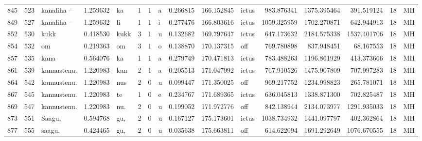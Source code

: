 \begin{tabular}{lrlrllllrrlrrrll}
845  &         523 &       kanaliha – &  1.259632 &      ka &        1 &      1 &       a &      0.266815 &    166.152845 &  ictus &   983.876341 &  1375.395464 &   391.519124 &     18 &        MH \\
849  &         527 &       kanaliha – &  1.259632 &      li &        1 &      1 &       i &      0.277476 &    166.803616 &  ictus &  1059.325959 &  1702.270871 &   642.944913 &     18 &        MH \\
852  &         530 &             kukk &  0.418530 &    kukk &        3 &      1 &       u &      0.132682 &    169.797647 &  ictus &   647.173632 &  2184.575338 &  1537.401706 &     18 &        MH \\
854  &         532 &               om &  0.219363 &      om &        3 &      1 &       o &      0.138870 &    170.137315 &    off &   769.780898 &   837.948451 &    68.167553 &     18 &        MH \\
857  &         535 &             kana &  0.564076 &      ka &        1 &      1 &       a &      0.279749 &    170.471813 &  ictus &   783.488263 &  1196.861929 &   413.373666 &     18 &        MH \\
861  &         539 &      kannustenu. &  1.220983 &     kan &        2 &      1 &       a &      0.205513 &    171.047992 &  ictus &   767.910526 &  1475.907809 &   707.997283 &     18 &        MH \\
864  &         542 &      kannustenu. &  1.220983 &     nus &        2 &      0 &       u &      0.099447 &    171.350025 &    off &   969.217752 &  1234.998823 &   265.781071 &     18 &        MH \\
867  &         545 &      kannustenu. &  1.220983 &      te &        1 &      0 &       e &      0.234767 &    171.689365 &  ictus &   636.045813 &  1338.871300 &   702.825487 &     18 &        MH \\
869  &         547 &      kannustenu. &  1.220983 &     nu. &        2 &      0 &       u &      0.199052 &    171.972776 &    off &   842.138944 &  2134.073977 &  1291.935033 &     18 &        MH \\
873  &         551 &           Saagu, &  0.594768 &     gu, &        2 &      0 &       u &      0.167127 &    175.173601 &  ictus &  1038.734932 &  1441.097797 &   402.362864 &     18 &        MH \\
877  &         555 &           saagu, &  0.424465 &     gu, &        2 &      0 &       u &      0.035638 &    175.663811 &    off &   614.622094 &  1691.292649 &  1076.670555 &     18 &        MH \\

\end{tabular}
